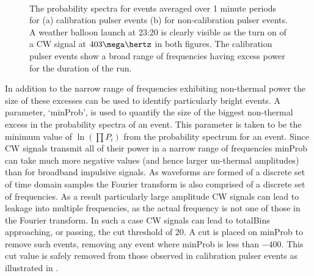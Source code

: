 \begin{figure}[htpb]
  \hfill
  \\
  \hfill
  \caption{The probability spectra for events averaged over 1 minute periods for (a) calibration pulser events (b) for non-calibration pulser events. A weather balloon launch at 23:20 is clearly visible as the turn on of a CW signal at $403 \mega \hertz$ in both figures. The calibration pulser events show a broad range of frequencies having excess power for the duration of the run.}
  \label{fig:analysis:CWRemoval:Filtering:CW-Time}
\end{figure}




In addition to the narrow range of frequencies exhibiting non-thermal power the size of these excesses can be used to identify particularly bright events. A parameter, `minProb', is used to quantify the size of the biggest non-thermal excess in the probability spectra of an event. This parameter is taken to be the minimum value of $\ln(\prod P_{i})$ from the probability spectrum for an event. Since CW signals transmit all of their power in a narrow range of frequencies minProb can take much more negative values (and hence larger un-thermal amplitudes) than for broadband impulsive signals. As waveforms are formed of a discrete set of time domain samples the Fourier transform is also comprised of a discrete set of frequencies. As a result particularly large amplitude CW signals can lead to leakage into multiple frequencies, as the actual frequency is not one of those in the Fourier transform. In such a case CW signals can lead to totalBins approaching, or passing, the cut threshold of 20. A cut is placed on minProb to remove such events, removing any event where minProb is less than $-400$. This cut value is safely removed from those observed in calibration pulser events as illustrated in .

